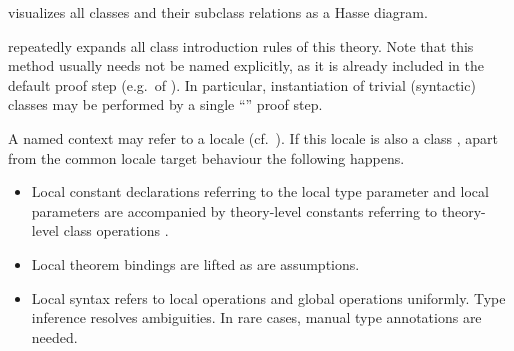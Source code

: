 \begin{isabellebody}
\begin{isamarkuptext}
\begin{description}
  \item \hyperlink{command.class-deps}{\mbox{}} visualizes all classes and their
  subclass relations as a Hasse diagram.

  \item \hyperlink{method.intro-classes}{\mbox{}} repeatedly expands all class
  introduction rules of this theory.  Note that this method usually
  needs not be named explicitly, as it is already included in the
  default proof step (e.g.\ of \hyperlink{command.proof}{\mbox{}}).  In particular,
  instantiation of trivial (syntactic) classes may be performed by a
  single ``\hyperlink{command.ddot}{\mbox{\isa{\isacommand{{\isachardot}{\isachardot}}}}}'' proof step.

  \end{description}%
\end{isamarkuptext}%
\isamarkuptrue%
%
\isamarkuptrue%
%
\begin{isamarkuptext}%

  A named context may refer to a locale (cf.\ ).
  If this locale is also a class , apart from the common
  locale target behaviour the following happens.

  \begin{itemize}

  \item Local constant declarations  referring to the
  local type parameter \isa{{\isasymalpha}} and local parameters 
  are accompanied by theory-level constants 
  referring to theory-level class operations .

  \item Local theorem bindings are lifted as are assumptions.

  \item Local syntax refers to local operations  and
  global operations  uniformly.  Type inference
  resolves ambiguities.  In rare cases, manual type annotations are
  needed.
  

\end{itemize}
\end{isamarkuptext}
\end{isabellebody}
